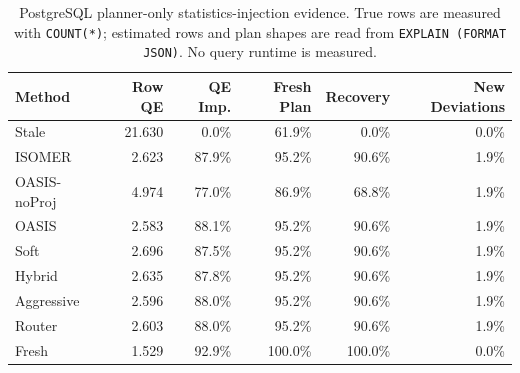 \begin{table}[t]
  \centering
  \small
  \caption{PostgreSQL planner-only statistics-injection evidence. True rows are measured with \texttt{COUNT(*)}; estimated rows and plan shapes are read from \texttt{EXPLAIN (FORMAT JSON)}. No query runtime is measured.}
  \label{tab:postgres_planner_stats_injection}
  \setlength{\tabcolsep}{4pt}
  \begin{tabular}{lrrrrr}
    \toprule
    Method & Row QE & QE Imp. & Fresh Plan & Recovery & New Deviations \\
    \midrule
    Stale & 21.630 & 0.0\% & 61.9\% & 0.0\% & 0.0\% \\
    ISOMER & 2.623 & 87.9\% & 95.2\% & 90.6\% & 1.9\% \\
    OASIS-noProj & 4.974 & 77.0\% & 86.9\% & 68.8\% & 1.9\% \\
    OASIS & 2.583 & 88.1\% & 95.2\% & 90.6\% & 1.9\% \\
    Soft & 2.696 & 87.5\% & 95.2\% & 90.6\% & 1.9\% \\
    Hybrid & 2.635 & 87.8\% & 95.2\% & 90.6\% & 1.9\% \\
    Aggressive & 2.596 & 88.0\% & 95.2\% & 90.6\% & 1.9\% \\
    Router & 2.603 & 88.0\% & 95.2\% & 90.6\% & 1.9\% \\
    Fresh & 1.529 & 92.9\% & 100.0\% & 100.0\% & 0.0\% \\
    \bottomrule
  \end{tabular}
\end{table}
